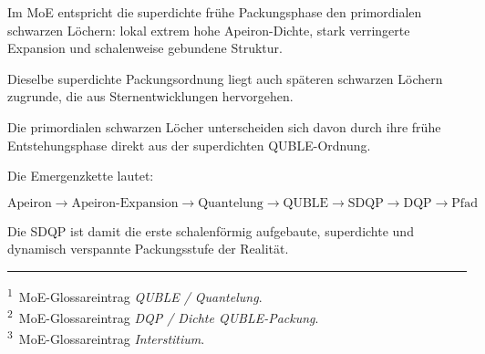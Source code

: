 \documentclass[11pt,a4paper]{article}
\begin{document}
Im MoE entspricht die superdichte frühe
Packungsphase den primordialen schwarzen
Löchern: lokal extrem hohe Apeiron-Dichte,
stark verringerte Expansion und schalenweise
gebundene Struktur.

Dieselbe superdichte Packungsordnung liegt
auch späteren schwarzen Löchern zugrunde,
die aus Sternentwicklungen hervorgehen.

Die primordialen schwarzen Löcher unterscheiden
sich davon durch ihre frühe Entstehungsphase
direkt aus der superdichten QUBLE-Ordnung.

Die Emergenzkette lautet:

\[
\text{Apeiron}
\rightarrow
\text{Apeiron-Expansion}
\rightarrow
\text{Quantelung}
\rightarrow
\text{QUBLE}
\rightarrow
\text{SDQP}
\rightarrow
\text{DQP}
\rightarrow
\text{Pfad}
\]

Die SDQP ist damit die erste schalenförmig
aufgebaute, superdichte und dynamisch
verspannte Packungsstufe der Realität.

\vspace{0.9em}
\hrule
\vspace{0.45em}

{\footnotesize
\textsuperscript{1}\ MoE-Glossareintrag
\emph{QUBLE / Quantelung}.\\
\textsuperscript{2}\ MoE-Glossareintrag
\emph{DQP / Dichte QUBLE-Packung}.\\
\textsuperscript{3}\ MoE-Glossareintrag
\emph{Interstitium}.
}
\end{document}
